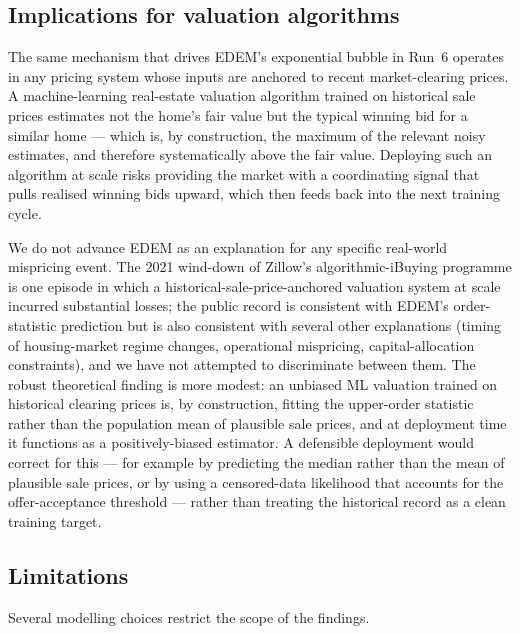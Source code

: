 \subsection{Implications for valuation algorithms}
\label{sec:disc-ml}

The same mechanism that drives EDEM's exponential bubble in Run~6
operates in any pricing system whose inputs are anchored to recent
market-clearing prices. A machine-learning real-estate valuation
algorithm trained on historical sale prices estimates not the home's
fair value but the typical winning bid for a similar home --- which
is, by construction, the maximum of the relevant noisy estimates,
and therefore systematically above the fair value. Deploying such an
algorithm at scale risks providing the market with a coordinating
signal that pulls realised winning bids upward, which then feeds
back into the next training cycle.

We do not advance EDEM as an explanation for any specific real-world
mispricing event. The 2021 wind-down of Zillow's algorithmic-iBuying
programme \citep{zillow2021ibuying} is one episode in which a
historical-sale-price-anchored valuation system at scale incurred
substantial losses; the public record is consistent with EDEM's
order-statistic prediction but is also consistent with several other
explanations (timing of housing-market regime changes, operational
mispricing, capital-allocation constraints), and we have not
attempted to discriminate between them. The robust theoretical
finding is more modest: an unbiased ML valuation trained on
historical clearing prices is, by construction, fitting the
upper-order statistic rather than the population mean of plausible
sale prices, and at deployment time it functions as a
positively-biased estimator. A defensible deployment would correct
for this --- for example by predicting the median rather than the
mean of plausible sale prices, or by using a censored-data
likelihood that accounts for the offer-acceptance threshold ---
rather than treating the historical record as a clean training
target.

\subsection{Limitations}
\label{sec:disc-limits}

Several modelling choices restrict the scope of the findings.

